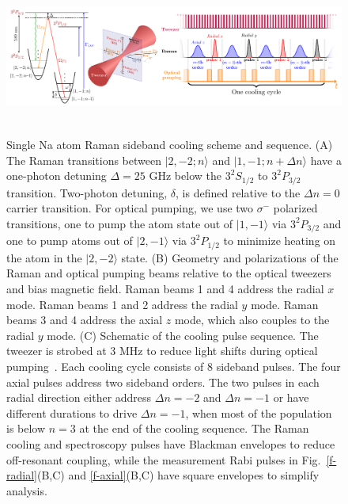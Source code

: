 \documentclass[aps,prl,twocolumn,groupedaddress]{revtex4-1}
\begin{document}
\begin{figure}
  \includegraphics[height=5.2cm]{fig1_combined.pdf}
  \caption{Single Na atom Raman sideband cooling scheme and sequence. (A)
    The Raman transitions between $|2,-2;n\rangle$ and $|1,-1;n+\Delta n\rangle$ have a one-photon detuning $\Delta=25$ GHz below the $3^2S_{1/2}$ to $3^2P_{3/2}$ transition. Two-photon detuning, $\delta$, is defined relative to the $\Delta n=0$ carrier transition. For optical pumping, we use two $\sigma^-$ polarized transitions, one   to  pump the atom state out of $|1,-1\rangle$ via $3^2P_{3/2}$ and one  to pump atoms out of $|2,-1\rangle$ via $3^2P_{1/2}$
     to minimize heating on the atom in the $|2,-2\rangle$ state.
    (B) Geometry and polarizations of the Raman and optical pumping beams relative to the
    optical tweezers and bias magnetic field.  Raman beams 1 and 4 address the radial $x$ mode. Raman beams 1 and 2 address the radial $y$ mode. Raman beams 3 and 4 address the axial $z$ mode, which also couples to the radial $y$ mode.
    (C) Schematic of the cooling pulse sequence. The tweezer is strobed at 3 MHz to
    reduce light shifts during optical pumping~\cite{Hutzler2017-LightShifts}.
    Each cooling cycle consists of $8$ sideband pulses.
    The four axial pulses address two sideband orders.
    The two pulses in each radial direction  either address $\Delta n=-2$ and $\Delta n=-1$
    or have different durations to drive $\Delta n=-1$, when most of the population is below $n=3$
    at the end of the cooling sequence.
    The Raman cooling and spectroscopy pulses have Blackman  envelopes to reduce  off-resonant
    coupling, while the measurement Rabi pulses in Fig.~\ref{f-radial}(B,C) and \ref{f-axial}(B,C) have square envelopes to simplify analysis.
    \label{f-setup}}
\end{figure}
\end{document}

